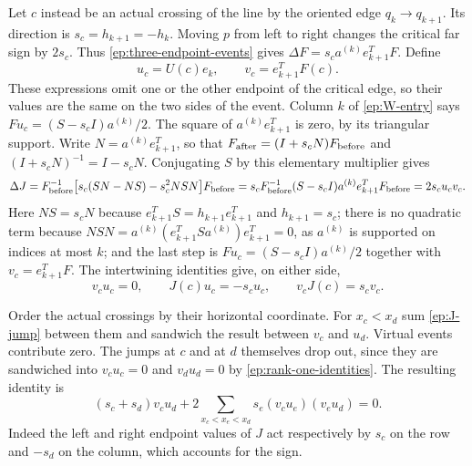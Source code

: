 \documentclass[11pt,letterpaper]{article}
\numberwithin{equation}{section}
\theoremstyle{definition}
\theoremstyle{remark}
\begin{document}
Let $c$ instead be an actual crossing of the line by the oriented edge
$q_k\to q_{k+1}$.  Its direction is
$s_c=h_{k+1}=-h_k$.  Moving $p$ from left to right changes the critical
far sign by $2s_c$.  Thus \eqref{ep:three-endpoint-events} gives
$\Delta F=s_c a^{(k)}e_{k+1}^{T}F$.  Define
\begin{equation}
 u_c=U(c)e_k,\qquad v_c=e_{k+1}^{T}F(c).
 \label{ep:uv}
\end{equation}
These expressions omit one or the other endpoint of the critical edge,
so their values are the same on the two sides of the event.
Column $k$ of \eqref{ep:W-entry} says
$F u_c=(S-s_c I)a^{(k)}/2$.  The square of
$a^{(k)}e_{k+1}^T$ is zero, by its triangular support.  Write $N=a^{(k)}e_{k+1}^{T}$, so that
$F_{\rm after}=(I+s_cN)F_{\rm before}$ and $(I+s_cN)^{-1}=I-s_cN$.
Conjugating $S$ by this elementary multiplier gives
\begin{equation}
 \Delta J
 =F_{\rm before}^{-1}\bigl[s_c(SN-NS)-s_c^2NSN\bigr]F_{\rm before}
 =s_cF_{\rm before}^{-1}(S-s_cI)a^{(k)}e_{k+1}^{T}F_{\rm before}
 =2s_c u_cv_c.
 \label{ep:J-jump}
\end{equation}
Here $NS=s_cN$ because $e_{k+1}^{T}S=h_{k+1}e_{k+1}^{T}$ and
$h_{k+1}=s_c$; there is no quadratic term because
$NSN=a^{(k)}(e_{k+1}^{T}Sa^{(k)})e_{k+1}^{T}=0$, as $a^{(k)}$ is
supported on indices at most $k$; and the last step is
$F u_c=(S-s_cI)a^{(k)}/2$ together with $v_c=e_{k+1}^{T}F$.  The intertwining identities give, on either side,
\begin{equation}
 v_cu_c=0,\qquad J(c)u_c=-s_cu_c,\qquad v_cJ(c)=s_cv_c.
 \label{ep:rank-one-identities}
\end{equation}

Order the actual crossings by their horizontal coordinate.  For $x_c<x_d$
sum \eqref{ep:J-jump} between them and sandwich the result between
$v_c$ and $u_d$.  Virtual events contribute zero.  The jumps at $c$ and at $d$ themselves
drop out, since they are sandwiched into $v_cu_c=0$ and $v_du_d=0$ by
\eqref{ep:rank-one-identities}.  The resulting identity is
\begin{equation}
 (s_c+s_d)v_cu_d+
 2\sum_{x_c<x_e<x_d}s_e(v_cu_e)(v_eu_d)=0.
 \label{ep:pairwise-cap}
\end{equation}
Indeed the left and right endpoint values of $J$ act respectively by
$s_c$ on the row and $-s_d$ on the column, which accounts for the sign.
\end{document}

